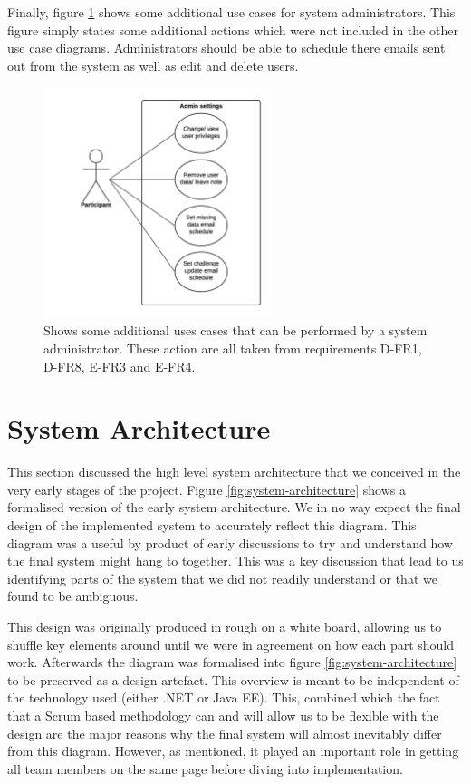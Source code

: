 Finally, figure \ref{fig:use-case-admin-settings} shows some additional use cases for system administrators. This figure simply states some additional actions which were not included in the other use case diagrams. Administrators should be able to schedule there emails sent out from the system as well as edit and delete users.

\begin{figure}[H]
\centering
\includegraphics[width=0.6\textwidth]{../design/UML/UseCase/Admin-Settings.png}
\caption{Shows some additional uses cases that can be performed by a system administrator. These action are all taken from requirements D-FR1, D-FR8, E-FR3 and E-FR4.}
\label{fig:use-case-admin-settings}
\end{figure}

\section{System Architecture}
This section discussed the high level system architecture that we conceived in the very early stages of the project. Figure \ref{fig:system-architecture} shows a formalised version of the early system architecture. We in no way expect the final design of the implemented system to accurately reflect this diagram. This diagram was a useful by product of early discussions to try and understand how the final system might hang to together. This was a key discussion that lead to us identifying parts of the system that we did not readily understand or that we found to be ambiguous. 

This design was originally produced in rough on a white board, allowing us to  shuffle key elements around until we were in agreement on how each part should work. Afterwards the diagram was formalised into figure \ref{fig:system-architecture} to be preserved as a design artefact. This overview is meant to be independent of the technology used (either .NET or Java EE). This, combined which the fact that a Scrum based methodology can and will allow us to be flexible with the design are the major reasons why the final system will almost inevitably differ from this diagram. However, as mentioned, it played an important role in getting all team members on the same page before diving into implementation.


